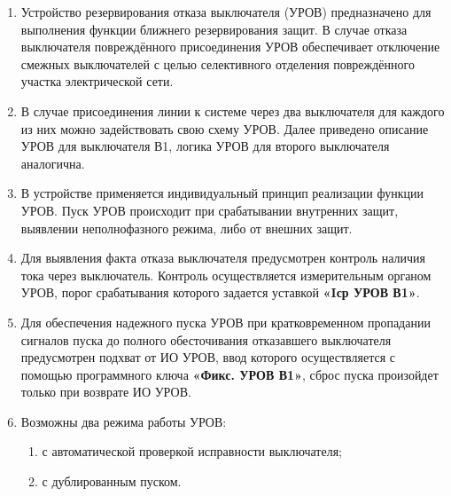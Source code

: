 
\color{black}

\begin{enumerate}[label=\arabic{section}.\arabic{subsection}.\arabic{enumi}, labelsep=4pt, leftmargin=0pt, itemindent=57pt, itemsep=0pt, parsep=0pt] %

\item
Устройство резервирования отказа выключателя (УРОВ) предназначено для выполнения функции ближнего резервирования защит. В случае отказа выключателя повреждённого присоединения УРОВ обеспечивает отключение смежных выключателей с целью селективного отделения повреждённого участка электрической сети.

\item
В случае присоединения линии к системе через два выключателя для каждого из них можно задействовать свою схему УРОВ. Далее приведено описание УРОВ для выключателя В1, логика УРОВ для второго выключателя аналогична.

\item
В устройстве применяется индивидуальный принцип реализации функции УРОВ. Пуск УРОВ происходит при срабатывании внутренних защит, выявлении неполнофазного режима, либо от внешних защит.

\item
Для выявления факта отказа выключателя предусмотрен контроль наличия тока через выключатель. Контроль осуществляется измерительным органом УРОВ, порог срабатывания которого задается уставкой \textbf{«Iср УРОВ В1»}.

\item
Для обеспечения надежного пуска УРОВ при кратковременном пропадании сигналов пуска до полного обесточивания отказавшего выключателя предусмотрен подхват от ИО УРОВ, ввод которого осуществляется с помощью программного ключа \textbf{«Фикс. УРОВ В1»}, сброс пуска произойдет только при возврате ИО УРОВ.

\item
Возможны два режима работы УРОВ:
\begin{enumerate}[label=\arabic*)]
    \item с автоматической проверкой исправности выключателя;
    \item с дублированным пуском.
\end{enumerate}


\end{enumerate}
